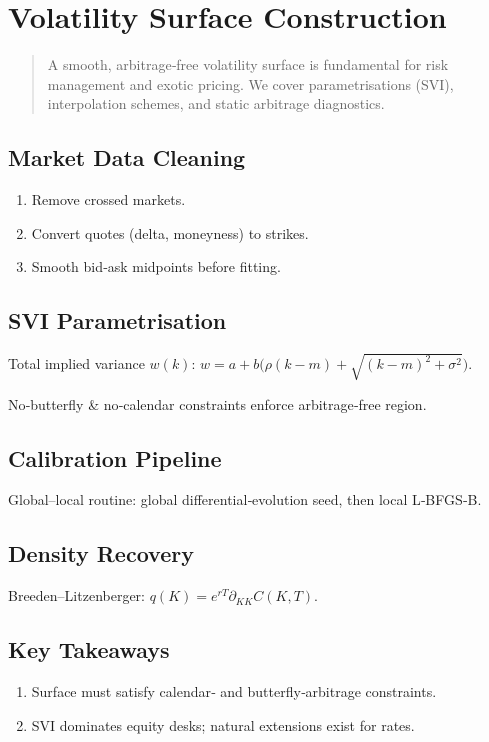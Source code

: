 \chapter{Volatility Surface Construction}\label{ch:volsurface}

\begin{abstract}
A smooth, arbitrage‑free volatility surface is fundamental for risk
management and exotic pricing.  We cover parametrisations (SVI),
interpolation schemes, and static arbitrage diagnostics.
\end{abstract}

\section{Market Data Cleaning}

\begin{enumerate}
  \item Remove crossed markets.
  \item Convert quotes (delta, moneyness) to strikes.
  \item Smooth bid‑ask midpoints before fitting.
\end{enumerate}

\section{SVI Parametrisation}

Total implied variance \(w(k)\):
\(w = a + b\bigl(\rho(k-m)+\sqrt{(k-m)^2+\sigma^2}\bigr)\).

No‑butterfly & no‑calendar constraints enforce arbitrage‑free region.

\section{Calibration Pipeline}

Global–local routine:
global differential‑evolution seed, then local L‑BFGS‑B.

\section{Density Recovery}

Breeden–Litzenberger:
\(q(K) = e^{rT} \partial_{KK} C(K,T)\).

\section*{Key Takeaways}
\begin{enumerate}
  \item Surface must satisfy calendar‑ and butterfly‑arbitrage constraints.
  \item SVI dominates equity desks; natural extensions exist for rates.
\end{enumerate}
